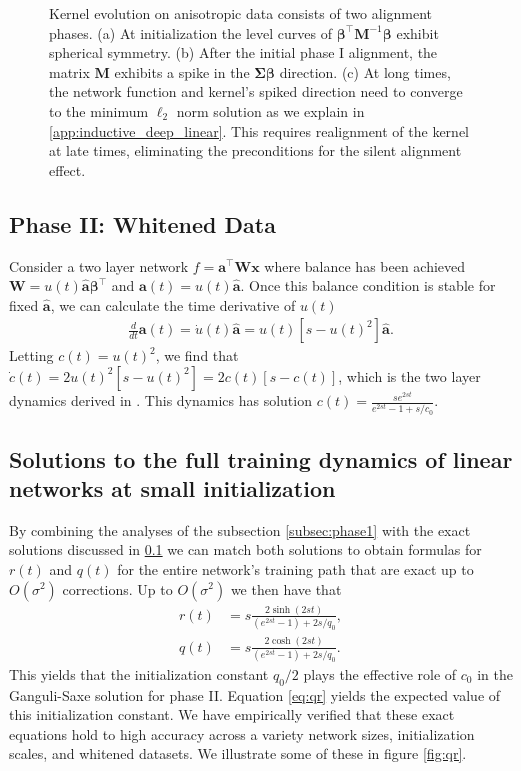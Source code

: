 \documentclass{article} %
\def\x{\bm x}
\begin{document}
\begin{appendix}
\begin{figure}
    \caption{Kernel evolution on anisotropic data consists of two alignment phases. (a) At initialization the level curves of $\bm\beta^\top \bm M^{-1} \bm\beta$ exhibit spherical symmetry. (b) After the initial phase I alignment, the matrix $\bm M$ exhibits a spike in the $\bm\Sigma \bm \beta$ direction. (c) At long times, the network function and kernel's spiked direction need to converge to the minimum $\ell_2$ norm solution as we explain in \ref{app:inductive_deep_linear}. This requires realignment of the kernel at late times, eliminating the preconditions for the silent alignment effect.  }
    \label{fig:anisotropic_visual}
\end{figure}

\subsection{Phase II: Whitened Data}\label{subsec:phase2}

Consider a two layer network $f = \bm a^\top \bm W \x$ where balance has been achieved $\bm W = u(t) \bm{\hat a} \bm\beta^\top$ and $\bm a(t) = u(t) \bm{\hat{a}}$. Once this balance condition is stable for fixed $\bm{\hat a}$, we can calculate the time derivative of $u(t)$
\begin{align}
    \frac{d}{dt} \bm a(t) = \dot{u}(t) \bm{\hat a} = u(t) \left[ s - u(t)^2 \right] \bm{\hat a}.
\end{align}
Letting $c(t) = u(t)^2$, we find that $\dot{c}(t) = 2 u(t)^2 \left[ s- u(t)^2  \right] = 2 c(t) \left[ s-c(t) \right]$, which is the two layer dynamics derived in \cite{Saxe14exactsolutions}. This dynamics has solution $c(t) = \frac{s e^{2st}}{e^{2st} -1 + s/c_0}$.

\subsection{Solutions to the full training dynamics of linear networks at small initialization}\label{subsec:solns_to_full_training}

By combining the analyses of the subsection \ref{subsec:phase1} with the exact solutions discussed in \ref{subsec:phase2} we can match both solutions to obtain formulas for $r(t)$ and $q(t)$ for the entire network's training path that are exact up to $O(\sigma^2)$ corrections. Up to $O(\sigma^2)$ we then have that
\begin{align}
    r(t) &= s \frac{2 \sinh(2 s t)}{(e^{2 s t } - 1) + 2s/q_0 },\\
    q(t) &= s \frac{2 \cosh(2 s t)}{(e^{2 s t } - 1) + 2s/q_0 }.
\end{align}
This yields that the initialization constant $q_0/2$ plays the effective role of $c_0$ in the Ganguli-Saxe solution for phase II. Equation \ref{eq:qr} yields the expected value of this initialization constant. We have empirically verified that these exact equations hold to high accuracy across a variety network sizes, initialization scales, and whitened datasets. We illustrate some of these in figure \ref{fig:qr}.




\end{appendix}
\end{document}
